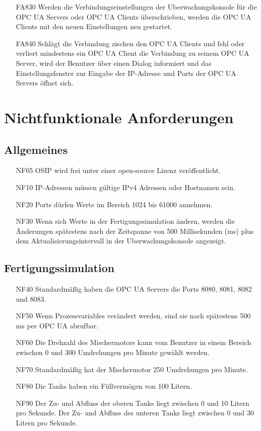 \documentclass[parskip=full]{scrartcl}
\begin{document}
\begin{enumerate}
  \item[FA830] Werden die Verbindungseinstellungen der \gls{Uberwachungskonsole} für die \glspl{OPC UA Server} oder \glspl{OPC UA Client} überschrieben, werden die \glspl{OPC UA Client} mit den neuen Einstellungen neu gestartet.
  \item[FA840] Schlägt die Verbindung zischen den \glspl{OPC UA Client} und  fehl oder verliert mindestens ein \gls{OPC UA Client} die Verbindung zu seinem \gls{OPC UA Server}, wird
    der Benutzer über einen Dialog informiert und das Einstellungsfenster zur Eingabe der \gls{IP-Adresse} und Ports der \glspl{OPC UA Server} öffnet sich.
\end{enumerate}

\pagebreak
\section{Nichtfunktionale Anforderungen}
\subsection{Allgemeines}
\begin{enumerate}
  \item[NF05] OSIP wird frei unter einer open-source Lizenz veröffentlicht.
  \item[NF10] IP-Adressen müssen gültige IPv4 Adressen oder Hostnamen sein.
  \item[NF20] Ports dürfen Werte im Bereich 1024 bis 61000 annehmen.
  \item[NF30] Wenn sich Werte in der \gls{Fertigungssimulation} ändern, werden die Änderungen spätestens nach der Zeitspanne von 500 Millisekunden (ms) plus dem Aktualisierungsintervall in der \gls{Uberwachungskonsole} angezeigt.
\end{enumerate}

\subsection{Fertigungssimulation}
\begin{enumerate}
  \item[NF40] Standardmäßig haben die \glspl{OPC UA Server} die Ports 8080, 8081, 8082 und 8083.
  \item[NF50] Wenn \glspl{Prozessvariable} verändert werden, sind sie nach spätestens 500 ms per \gls{OPC UA} abrufbar.
  \item[NF60] Die Drehzahl des Mischermotors kann vom Benutzer in einem Bereich zwischen 0 und 300 Umdrehungen pro Minute gewählt werden.
  \item[NF70] Standardmäßig hat der Mischermotor 250 Umdrehungen pro Minute.
  \item[NF80] Die Tanks haben ein Füllvermögen von 100 Litern.
  \item[NF90] Der Zu- und Abfluss der oberen Tanks liegt zwischen 0 und 10 Litern pro Sekunde. Der Zu- und Abfluss des unteren Tanks liegt zwischen 0 und 30 Litern pro Sekunde.
\end{enumerate}
\end{document}
